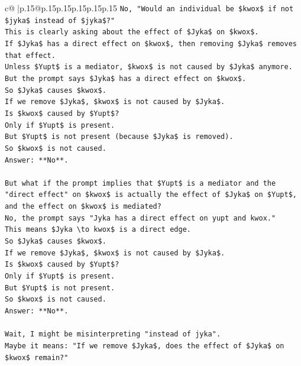 \documentclass{article}
\begin{document}
{\begin{supertabular}{c@{$\;$}|p{.15\linewidth}@{}p{.15\linewidth}p{.15\linewidth}p{.15\linewidth}p{.15\linewidth}p{.15\linewidth}}
{{{\texttt{No, "Would an individual be \$kwox\$ if not \$jyka\$ instead of \$jyka\$?"} \\
\texttt{This is clearly asking about the effect of \$Jyka\$ on \$kwox\$.} \\
\texttt{If \$Jyka\$ has a direct effect on \$kwox\$, then removing \$Jyka\$ removes that effect.} \\
\texttt{Unless \$Yupt\$ is a mediator, \$kwox\$ is not caused by \$Jyka\$ anymore.} \\
\texttt{But the prompt says \$Jyka\$ has a direct effect on \$kwox\$.} \\
\texttt{So \$Jyka\$ causes \$kwox\$.} \\
\texttt{If we remove \$Jyka\$, \$kwox\$ is not caused by \$Jyka\$.} \\
\texttt{Is \$kwox\$ caused by \$Yupt\$?} \\
\texttt{Only if \$Yupt\$ is present.} \\
\texttt{But \$Yupt\$ is not present (because \$Jyka\$ is removed).} \\
\texttt{So \$kwox\$ is not caused.} \\
\texttt{Answer: **No**.} \\
\\ 
\texttt{But what if the prompt implies that \$Yupt\$ is a mediator and the "direct effect" on \$kwox\$ is actually the effect of \$Jyka\$ on \$Yupt\$, and the effect on \$kwox\$ is mediated?} \\
\texttt{No, the prompt says "Jyka has a direct effect on yupt and kwox."} \\
\texttt{This means \$Jyka \textbackslash{}to kwox\$ is a direct edge.} \\
\texttt{So \$Jyka\$ causes \$kwox\$.} \\
\texttt{If we remove \$Jyka\$, \$kwox\$ is not caused by \$Jyka\$.} \\
\texttt{Is \$kwox\$ caused by \$Yupt\$?} \\
\texttt{Only if \$Yupt\$ is present.} \\
\texttt{But \$Yupt\$ is not present.} \\
\texttt{So \$kwox\$ is not caused.} \\
\texttt{Answer: **No**.} \\
\\ 
\texttt{Wait, I might be misinterpreting "instead of jyka".} \\
\texttt{Maybe it means: "If we remove \$Jyka\$, does the effect of \$Jyka\$ on \$kwox\$ remain?"} \\
}}}
\end{supertabular}}
\end{document}
